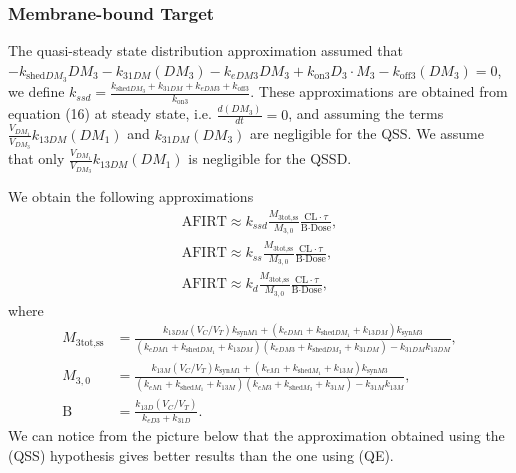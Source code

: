 \subsubsection{Membrane-bound Target}

The quasi-steady state distribution approximation assumed that $-k_{\text{shed}DM_3}DM_3-k_{31DM}(DM_3) - k_{eDM3}DM_3+k_{\text{on}3}D_3 \cdot M_3 - k_{\text{off}3}(DM_3) = 0 $, we define $k_{ssd}=\frac{k_{\text{shed}DM_3} +k_{31DM}+ k_{eDM3}+ k_{\text{off}3}}{k_{\text{on}3}}$. 
These approximations are obtained from equation (16) at steady state, i.e. $\frac{d(DM_3)}{dt}=0$, and assuming the terms $ \frac{V_{DM_1}}{V_{DM_3}}k_{13DM}(DM_1)$ and $ k_{31DM}(DM_3) $ are negligible for the QSS. We assume that only $\frac{V_{DM_1}}{V_{DM_3}}k_{13DM}(DM_1)$ is negligible for the QSSD. 

We obtain the following approximations 
\begin{align*}
\text{AFIRT} \approx k_{ssd}\frac{M_{3\text{tot,ss}}}{M_{3,0}}\frac{\text{CL}\cdot\tau}{\text{B}\cdot\text{Dose}},\\
\text{AFIRT} \approx k_{ss}\frac{M_{3\text{tot,ss}}}{M_{3,0}}\frac{\text{CL}\cdot\tau}{\text{B}\cdot\text{Dose}},\\
\text{AFIRT} \approx k_{d}\frac{M_{3\text{tot,ss}}}{M_{3,0}}\frac{\text{CL}\cdot\tau}{\text{B}\cdot\text{Dose}},
\end{align*}  
where 
\begin{align*}
M_{3\text{tot,ss}}&=\frac{k_{13DM}(V_C/V_T)k_{\text{syn}M1}+(k_{eDM1}+k_{\text{shed}DM_1}+k_{13DM})k_{\text{syn}M3}}{(k_{eDM1}+k_{\text{shed}DM_1}+k_{13DM})(k_{eDM3}+k_{\text{shed}DM_3}+k_{31DM})-k_{31DM}k_{13DM}},\\
M_{3,0}&=\frac{k_{13M}(V_C/V_T)k_{\text{syn}M1}+(k_{eM1}+k_{\text{shed}M_1}+k_{13M})k_{\text{syn}M3}}{(k_{eM1}+k_{\text{shed}M_1}+k_{13M})(k_{eM3}+k_{\text{shed}M_3}+k_{31M})-k_{31M}k_{13M}},\\
\text{B}&=\frac{k_{13D}(V_C/V_T)}{k_{eD3}+k_{31D}}.
\end{align*}
We can notice from the picture below that the approximation obtained using the (QSS) hypothesis gives better results than the one using (QE).

